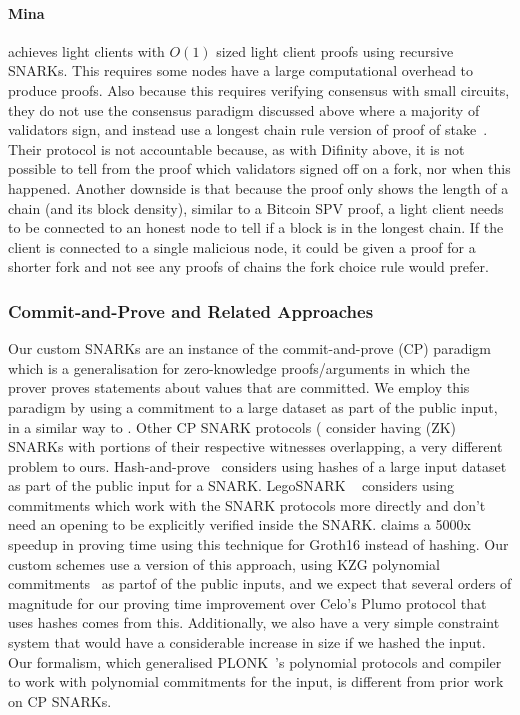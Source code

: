 \paragraph{Mina~\cite{mina}} achieves light clients with $O(1)$ sized light client proofs using recursive SNARKs. This requires some nodes have a large computational overhead to produce proofs. Also because this requires verifying consensus with small circuits, they do not use the consensus paradigm
discussed above where a majority of validators sign, and instead use a longest chain rule version of proof of stake~\cite{mina}.
Their protocol is not accountable because, as with Difinity above, it is not possible to tell from the proof which validators signed off on a fork, nor when this happened.
Another downside is that because the proof only shows the length of a chain (and its block density), similar to a Bitcoin SPV proof, a light client needs to be
connected to an honest node to tell if a block is in the longest chain. If the client is connected to a single malicious node, it could be given a proof for a
shorter fork and not see any proofs of chains the fork choice rule would prefer.
\vspace{-0.03cm}
\subsubsection{Commit-and-Prove and Related Approaches}
\label{sec:commit_prove}

\noindent Our custom SNARKs are an instance of the commit-and-prove (CP) paradigm~\cite{KilianPhD,CLOS02,CP_proposal,HP_paper,CP_paper,lunar,eclipse}
which is a generalisation for zero-knowledge proofs/arguments in which the prover proves statements about values that are committed. We employ this paradigm by using a commitment to a large dataset as part of the public
input, in a similar way to \cite{HP_paper,CP_paper}. Other CP SNARK protocols (\cite{CP_paper,interoperability_2,lunar,eclipse} consider having (ZK) SNARKs with portions of their respective witnesses overlapping, a very
different problem to ours. Hash-and-prove~\cite{HP_paper} considers using hashes of a large input dataset as part of the public input for a SNARK. LegoSNARK ~\cite{CP_paper} considers using commitments which work
with the SNARK protocols more directly and don't need an opening to be explicitly verified inside the SNARK. \cite{CP_paper} claims a 5000x speedup in proving time using this technique for Groth16 instead of hashing. Our
custom schemes use a version of this approach, using KZG polynomial commitments~\cite{KZG_10} as partof of the public inputs, and we expect that several orders of magnitude for our proving time improvement over Celo's
Plumo protocol that uses hashes comes from this. Additionally, we also have a very simple constraint system that would have a considerable increase in size if we hashed the input.
Our formalism, which generalised PLONK~\cite{plonk}'s polynomial protocols and compiler to work with polynomial commitments for the input, is different from prior work on CP SNARKs.


